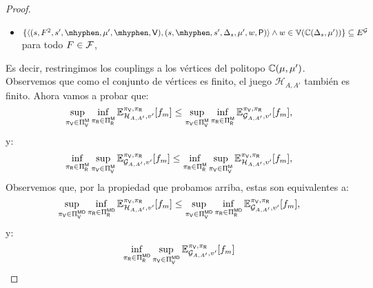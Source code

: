 \begin{proof}
\begin{itemize}
	 \item $\{ \langle (s, F^2, s', \mhyphen, \mu', \mhyphen, \Verifier), (s, \mhyphen, s', \Dirac_s, \mu', w, \Probabilistic) \rangle \wedge w \in \vertices{\couplings{\Dirac_s}{\mu'}} \} \subseteq E^\StochG$ para todo $F \in \mathcal{F}$,
\end{itemize}
Es decir, restringimos los couplings a los vértices del politopo $\mathbb{C}(\mu,\mu')$.  Observemos que como el conjunto de vértices es finito, el juego  $\mathcal{H}_{A,A'}$ también es finito.  
Ahora vamos a probar que:
\begin{equation}\label{eq:theo:determined:eq2}
    \sup_{\pi_{\mathsf{V}} \in \Pi_{\mathsf{V}}^{\mathsf{M}}} \inf_{\pi_{\mathsf{R}} \in \Pi_{\mathsf{R}}^{\mathsf{M}}} \mathbb{E}_{\mathcal{H}_{A,A'},v'}^{\pi_{\mathsf{V}},\pi_{\mathsf{R}}}[f_{m}]
    \leq 
     \sup_{\pi_{\mathsf{V}} \in \Pi_{\mathsf{V}}^{\mathsf{M}}} \inf_{\pi_{\mathsf{R}} \in \Pi_{\mathsf{R}}^{\mathsf{M}}} \mathbb{E}_{\mathcal{G}_{A,A'},v'}^{\pi_{\mathsf{V}},\pi_{\mathsf{R}}}[f_{m}],
\end{equation}
y:
\begin{equation}\label{eq:theo:determined:eq3}
    \inf_{\pi_{\mathsf{R}} \in \Pi_{\mathsf{R}}^{\mathsf{M}}} \sup_{\pi_{\mathsf{V}} \in \Pi_{\mathsf{V}}^{\mathsf{M}}} \mathbb{E}_{\mathcal{G}_{A,A'},v'}^{\pi_{\mathsf{V}},\pi_{\mathsf{R}}}[f_{m}]
    \leq 
     \inf_{\pi_{\mathsf{R}} \in \Pi_{\mathsf{R}}^{\mathsf{M}}} \sup_{\pi_{\mathsf{V}} \in \Pi_{\mathsf{V}}^{\mathsf{M}}} \mathbb{E}_{\mathcal{H}_{A,A'},v'}^{\pi_{\mathsf{V}},\pi_{\mathsf{R}}}[f_{m}],
\end{equation}
    Observemos que, por la propiedad que probamos arriba, estas son equivalentes a:
\begin{equation}\label{eq:theo:determined:eq4}
    \sup_{\pi_{\mathsf{V}} \in \Pi_{\mathsf{V}}^{\mathsf{M}\mathsf{D}}} \inf_{\pi_{\mathsf{R}} \in \Pi_{\mathsf{R}}^{\mathsf{M}\mathsf{D}}} \mathbb{E}_{\mathcal{H}_{A,A'},v'}^{\pi_{\mathsf{V}},\pi_{\mathsf{R}}}[f_{m}]
    \leq 
     \sup_{\pi_{\mathsf{V}} \in \Pi_{\mathsf{V}}^{\mathsf{M}\mathsf{D}}} \inf_{\pi_{\mathsf{R}} \in \Pi_{\mathsf{R}}^{\mathsf{M}\mathsf{D}}} \mathbb{E}_{\mathcal{G}_{A,A'},v'}^{\pi_{\mathsf{V}},\pi_{\mathsf{R}}}[f_{m}],
\end{equation}
y:
\begin{equation}\label{eq:theo:determined:eq5}
    \inf_{\strat{\Refuter} \in \Strategies{\Refuter}^{\Memoryless\Deterministic}} \sup_{\strat{\Verifier} \in \Strategies{\Verifier}^{\Memoryless\Deterministic}} \mathbb{E}_{\mathcal{G}_{A,A'},v'}^{\strat{\Verifier},\strat{\Refuter}}[\FMask]

\end{equation}
\end{proof}
